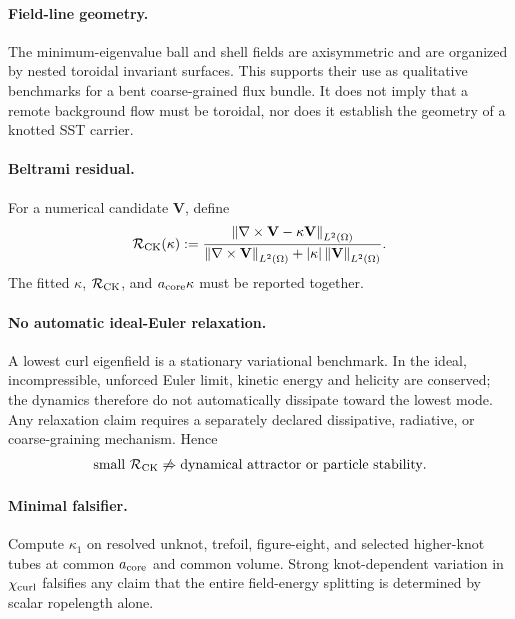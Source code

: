     \paragraph{Field-line geometry.}
    The minimum-eigenvalue ball and shell fields are axisymmetric and are organized
    by nested toroidal invariant surfaces.  This supports their use as qualitative
    benchmarks for a bent coarse-grained flux bundle.  It does not imply that a
    remote background flow must be toroidal, nor does it establish the geometry of a
    knotted SST carrier.

    \paragraph{Beltrami residual.}
    For a numerical candidate \(\mathbf{V}\), define
    \begin{align}
        \mathcal R_{\rm CK}(\kappa)
        :=
        \frac{
        \left\|
        \nabla\times\mathbf{V}-\kappa\mathbf{V}
        \right\|_{L^2(\Omega)}
        }{
        \left\|\nabla\times\mathbf{V}\right\|_{L^2(\Omega)}
        +
        |\kappa|\left\|\mathbf{V}\right\|_{L^2(\Omega)}
        }.
        \label{eq:rt_ck_residual}
    \end{align}
    The fitted \(\kappa\), \(\mathcal R_{\rm CK}\), and
    \(a_{\rm core}\kappa\) must be reported together.

    \paragraph{No automatic ideal-Euler relaxation.}
    A lowest curl eigenfield is a stationary variational benchmark.  In the ideal,
    incompressible, unforced Euler limit, kinetic energy and helicity are conserved;
    the dynamics therefore do not automatically dissipate toward the lowest mode.
    Any relaxation claim requires a separately declared dissipative, radiative, or
    coarse-graining mechanism.  Hence
    \begin{align}
        \text{small }\mathcal R_{\rm CK}
        \not\Rightarrow
        \text{dynamical attractor or particle stability}.
        \label{eq:rt_ck_no_relaxation_guard}
    \end{align}

    \paragraph{Minimal falsifier.}
    Compute \(\kappa_1\) on resolved unknot, trefoil, figure-eight, and selected
    higher-knot tubes at common \(a_{\rm core}\) and common volume.  Strong
    knot-dependent variation in \(\chi_{\rm curl}\) falsifies any claim that the
    entire field-energy splitting is determined by scalar ropelength alone.

